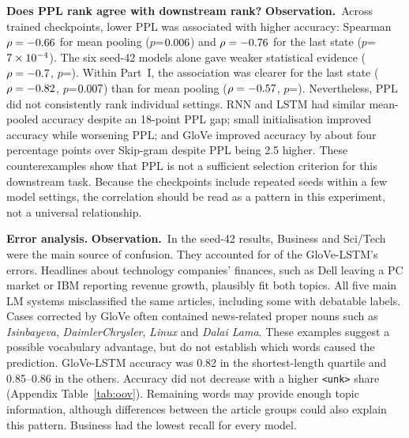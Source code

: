 \documentclass[10pt]{article}
\newcommand{\obs}{\textbf{Observation.}~}
\begin{document}
\textbf{Does PPL rank agree with downstream rank?} \obs Across \nAll{} trained checkpoints, lower PPL was associated
with higher accuracy: Spearman $\rho=-0.66$ for mean pooling ($p$=$0.006$) and $\rho=-0.76$ for
the last state ($p$=$7\times10^{-4}$). The six seed-42 models alone gave weaker statistical evidence
($\rho=-0.7$, $p$=\rhoMeanP). Within Part~I, the association was clearer for the last state ($\rho=-0.82$,
$p$=$0.007$) than for mean pooling ($\rho=-0.57$, $p$=\rhoPIMeanP). Nevertheless, PPL did not
consistently rank individual settings. RNN and LSTM had similar mean-pooled accuracy despite an 18-point PPL gap;
small initialisation improved accuracy while worsening PPL; and GloVe improved accuracy by about four percentage
points over Skip-gram despite PPL being 2.5 higher. These counterexamples show that PPL is not a sufficient
selection criterion for this downstream task. Because the checkpoints include repeated seeds within a few model
settings, the correlation should be read as a pattern in this experiment, not a universal relationship.

\textbf{Error analysis.} \obs In the seed-42 results, Business and Sci/Tech were the main source of confusion. They
accounted for \bizSci{} of the GloVe-LSTM's \gloveErrors{} errors. Headlines about technology companies' finances,
such as Dell leaving a PC market or IBM reporting revenue growth, plausibly fit both topics. All five main LM systems
misclassified the same \allWrong{} articles, including some with debatable labels. Cases corrected by GloVe often
contained news-related proper nouns such as \emph{Isinbayeva}, \emph{DaimlerChrysler}, \emph{Linux} and
\emph{Dalai Lama}. These examples suggest a possible vocabulary advantage, but do not establish which words caused
the prediction. GloVe-LSTM accuracy was 0.82 in the shortest-length quartile and 0.85--0.86 in the others. Accuracy
did not decrease with a higher \texttt{<unk>} share (Appendix Table~\ref{tab:oov}). Remaining words may provide
enough topic information, although differences between the article groups could also explain this pattern.
Business had the lowest recall for every model.
\end{document}

